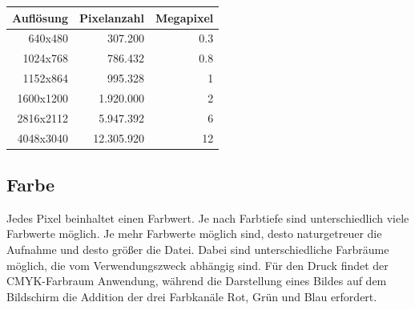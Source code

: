\documentclass[11pt]{article}
\begin{document}
\begin{center}
\begin{tabular}{rrr}
Auflösung & Pixelanzahl & Megapixel\\
\hline
640x480 & 307.200 & 0.3\\
1024x768 & 786.432 & 0.8\\
1152x864 & 995.328 & 1\\
1600x1200 & 1.920.000 & 2\\
2816x2112 & 5.947.392 & 6\\
4048x3040 & 12.305.920 & 12\\
\end{tabular}
\end{center}
\subsection{Farbe}
\label{sec:orgab6afa6}
Jedes Pixel beinhaltet einen Farbwert. Je nach Farbtiefe sind unterschiedlich viele Farbwerte möglich. Je mehr Farbwerte möglich sind, desto naturgetreuer die Aufnahme und desto größer die Datei. Dabei sind unterschiedliche Farbräume möglich, die vom Verwendungszweck abhängig sind. Für den Druck findet der CMYK-Farbraum Anwendung, während die Darstellung eines Bildes auf dem Bildschirm die Addition der drei Farbkanäle Rot, Grün und Blau erfordert.
\end{document}
